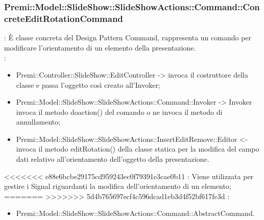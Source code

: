 {                     \subsubsection{Premi::Model::SlideShow::SlideShowActions::Command::ConcreteEditRotationCommand}{
				\textbf{\tipo}: È classe concreta del Design Pattern Command, rappresenta un comando per modificare l'orientamento di un elemento della presentazione.\\	
				\textbf{\relaz}: 
				\begin{itemize}
					\item Premi::Controller::SlideShow::EditController -> invoca il costruttore della classe e passa l’oggetto così creato all’Invoker;
					\item Premi::Model::SlideShow::SlideShowActions::Command::Invoker -> Invoker invoca il metodo doaction() del comando o ne invoca il metodo di annullamento;
                    \item Premi::Model::SlideShow::SlideShowActions::InsertEditRemove::Editor <- invoca il metodo editRotation() della classe statica per la modifica del campo dati relativo all'orientamento dell'oggetto della presentazione.
				\end{itemize}	
<<<<<<< e88e6bcbe29175cd959243ec0f79391e3cae0b11
                \textbf{\interfacce}: Viene utilizzata per gestire i Signal riguardanti la modifica dell'orientamento di un elemento;\\
=======
>>>>>>> 5d4b765697ecf4c596dcad1eb3d4f52bf617fc3d
                \textbf{\base}: 
                    \begin{itemize}
                    \item Premi::Model::SlideShow::SlideShowActions::Command::AbstractCommand.
                    \end{itemize}
                    }
}
